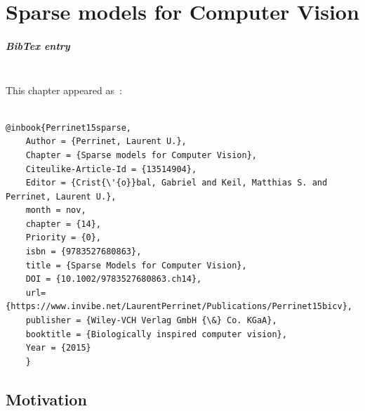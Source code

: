 \documentclass[a4paper, 11pt]{book}
\author{Perrinet}\title{\Title}
\newcommand{\AuthorA}{Laurent U.~Perrinet}%
\newcommand{\Title}{Sparse models for Computer Vision}%
\newcommand{\Abstract}{
The representation of images in the brain is known to be sparse.
That is, as neural activity is recorded in a visual area
---for instance the primary visual cortex of primates---
only a few neurons are active at a given time with respect to the whole population.
It is believed that such a property reflects the efficient match of the representation
with the statistics of natural scenes.
Applying such a paradigm to computer vision
therefore seems a promising approach towards more biomimetic algorithms.
Herein, we will describe a biologically-inspired approach to this problem.
First, we will describe an unsupervised learning paradigm
which is particularly adapted to the efficient coding of image patches.
Then, we will outline a complete multi-scale framework ---SparseLets---
implementing a biologically inspired sparse representation of natural images.
Finally, we will propose novel methods for integrating
prior information into these algorithms and provide some preliminary experimental results.
We will conclude by giving some perspective on applying such algorithms to computer vision.
More specifically, we will propose that bio-inspired approaches
may be applied to computer vision using predictive coding schemes,
sparse models being one simple and efficient instance of such schemes.
}%
\begin{document}
%
%
\frontmatter
\mainmatter
\addtocounter{chapter}{13} %
\chapter{\Title}

\paragraph{BibTex entry}~~\\

This chapter appeared as~\citep{Perrinet15sparse}:
\begin{verbatim}

@inbook{Perrinet15sparse,
	Author = {Perrinet, Laurent U.},
	Chapter = {Sparse models for Computer Vision},
	Citeulike-Article-Id = {13514904},
	Editor = {Crist{\'{o}}bal, Gabriel and Keil, Matthias S. and Perrinet, Laurent U.},
    month = nov,
	chapter = {14},
	Priority = {0},
	isbn = {9783527680863},
	title = {Sparse Models for Computer Vision},
	DOI = {10.1002/9783527680863.ch14},
    url={https://www.invibe.net/LaurentPerrinet/Publications/Perrinet15bicv},
    publisher = {Wiley-VCH Verlag GmbH {\&} Co. KGaA},
	booktitle = {Biologically inspired computer vision},
	Year = {2015}
	}
\end{verbatim}
\tableofcontents

\section{Motivation}
\end{document}
